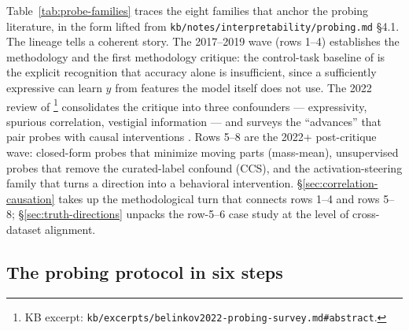 Table~\ref{tab:probe-families} traces the eight families that anchor the
 probing literature, in the form lifted from
\nolinkurl{kb/notes/interpretability/probing.md} \S 4.1. The lineage tells
a coherent story. The 2017--2019 wave (rows 1--4) establishes the
methodology and the first methodology critique: the control-task
baseline of \citet{hewitt2019-control-tasks} is the explicit recognition
that  accuracy alone is insufficient, since a sufficiently
expressive  can learn $y$ from features the model itself does not
use. The 2022 review of \citet{belinkov2022-probing-survey}\footnote{KB
excerpt: \nolinkurl{kb/excerpts/belinkov2022-probing-survey.md#abstract}.}
consolidates the critique into three confounders —  expressivity,
spurious correlation, vestigial information — and surveys the
``advances'' that pair probes with causal interventions
\citep[\S abstract; advances]{belinkov2022-probing-survey}. Rows 5--8 are
the 2022+ post-critique wave: closed-form probes that minimize moving
parts (mass-mean), unsupervised probes that remove the curated-label
confound (CCS), and the activation-steering family that turns a 
direction into a behavioral intervention. \S\ref{sec:correlation-causation}
takes up the methodological turn that connects rows 1--4 and rows 5--8;
\S\ref{sec:truth-directions} unpacks the row-5--6 case study at the level
of cross-dataset alignment.

\subsection{The probing protocol in six steps}
\label{sec:probe-protocol}

